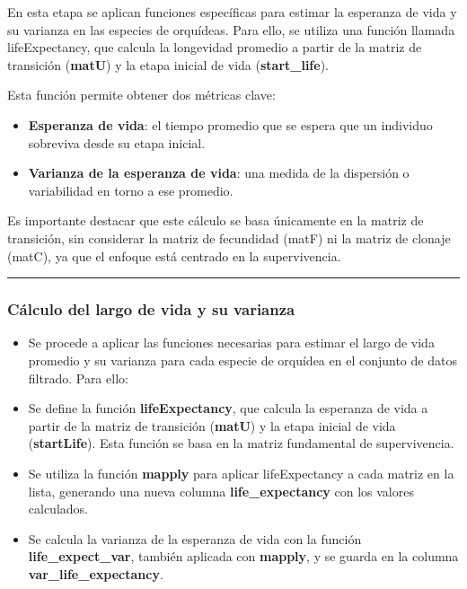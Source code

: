 \documentclass[
  12pt,
  letterpaper,
]{book}
\providecommand{\tightlist}{%
  \setlength{\itemsep}{0pt}\setlength{\parskip}{0pt}}\usepackage{longtable,booktabs,array}
\begin{document}
En esta etapa se aplican funciones específicas para estimar la esperanza
de vida y su varianza en las especies de orquídeas. Para ello, se
utiliza una función llamada lifeExpectancy, que calcula la longevidad
promedio a partir de la matriz de transición (\textbf{matU}) y la etapa
inicial de vida (\textbf{start\_life}).

Esta función permite obtener dos métricas clave:

\begin{itemize}
\tightlist
\item
  \textbf{Esperanza de vida}: el tiempo promedio que se espera que un
  individuo sobreviva desde su etapa inicial.
\item
  \textbf{Varianza de la esperanza de vida}: una medida de la dispersión
  o variabilidad en torno a ese promedio.
\end{itemize}

Es importante destacar que este cálculo se basa únicamente en la matriz
de transición, sin considerar la matriz de fecundidad (matF) ni la
matriz de clonaje (matC), ya que el enfoque está centrado en la
supervivencia.

\begin{center}\rule{0.5\linewidth}{0.5pt}\end{center}

\subsubsection{Cálculo del largo de vida y su
varianza}\label{cuxe1lculo-del-largo-de-vida-y-su-varianza-1}

\begin{itemize}
\item
  Se procede a aplicar las funciones necesarias para estimar el largo de
  vida promedio y su varianza para cada especie de orquídea en el
  conjunto de datos filtrado. Para ello:
\item
  Se define la función \textbf{lifeExpectancy}, que calcula la esperanza
  de vida a partir de la matriz de transición (\textbf{matU}) y la etapa
  inicial de vida (\textbf{startLife}). Esta función se basa en la
  matriz fundamental de supervivencia.
\item
  Se utiliza la función \textbf{mapply} para aplicar lifeExpectancy a
  cada matriz en la lista, generando una nueva columna
  \textbf{life\_expectancy} con los valores calculados.
\item
  Se calcula la varianza de la esperanza de vida con la función
  \textbf{life\_expect\_var}, también aplicada con \textbf{mapply}, y se
  guarda en la columna \textbf{var\_life\_expectancy}.
\end{itemize}
\end{document}
